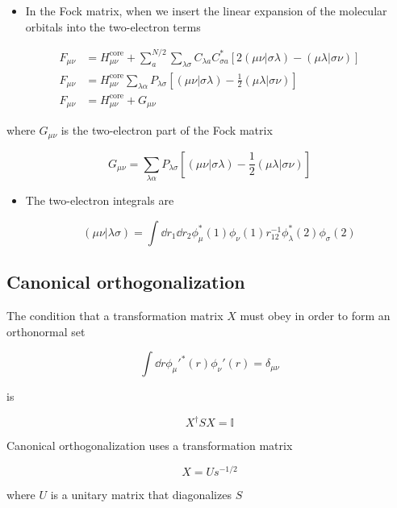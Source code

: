 \documentclass[11pt]{article}
\begin{document}
\begin{itemize}
\item In the Fock matrix, when we insert the linear expansion of the molecular orbitals into the two-electron terms
\end{itemize}


\begin{align*}
    F_{\mu\nu} &= H_{\mu\nu}^{\text{core}} + \sum_a^{N/2}\sum_{\lambda\sigma}C_{\lambda a}C_{\sigma a}^{ * }[2(\mu\nu|\sigma\lambda) - (\mu\lambda|\sigma\nu)] \\
    F_{\mu\nu} &= H_{\mu\nu}^{\text{core}} \sum_{\lambda\alpha} P_{\lambda\sigma}[(\mu\nu|\sigma\lambda) - \frac{1}{2}(\mu\lambda|\sigma\nu)] \\
    F_{\mu\nu} &= H_{\mu\nu}^{\text{core}} + G_{\mu\nu}
\end{align*}

where \(G_{\mu\nu}\) is the two-electron part of the Fock matrix

\begin{equation}
\label{eq:G-mat}
G_{\mu\nu}= \sum_{\lambda\alpha} P_{\lambda\sigma}[(\mu\nu|\sigma\lambda) - \frac{1}{2}(\mu\lambda|\sigma\nu)]
\end{equation}

\begin{itemize}
\item The two-electron integrals are

\[ (\mu\nu|\lambda\sigma) = \int\dd{r_1}\dd{r_2} \phi_{\mu}^{ * }(1)\phi_{\nu}(1)r_{12}^{-1}\phi_{\lambda}^{ * }(2)\phi_{\sigma}(2) \]
\end{itemize}
\subsection{Canonical orthogonalization}
\label{sec:org8df9bea}

The condition that a transformation matrix \(X\) must obey in order to form an orthonormal set

\[ \int\dd{r} \phi_{\mu}'^{ * } (r) \phi_{\nu}' (r) = \delta_{\mu\nu}\]

is

\[ X^{\dagger}S X = \mathbb{I} \]

Canonical orthogonalization uses a transformation matrix

\begin{equation}
\label{eq:X-mat}
X = Us^{-1/2}
\end{equation}

where \(U\) is a unitary matrix that diagonalizes \(S\)
\end{document}
